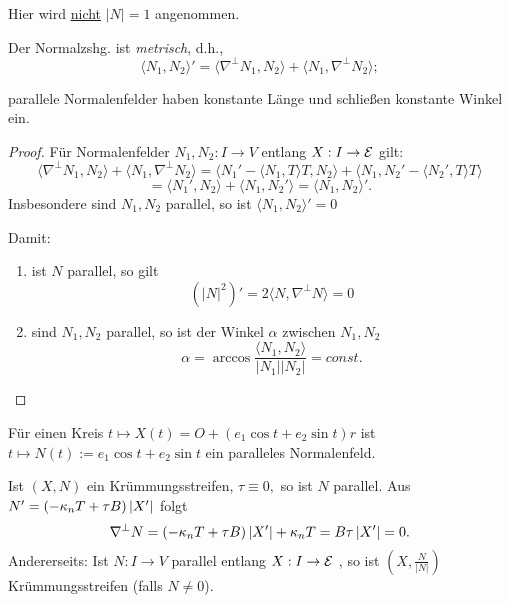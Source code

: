 \begin{remark}
	Hier wird \underline{nicht} $| N | = 1$ angenommen.
\end{remark}

\begin{lemma}
	Der Normalzshg. ist \emph{metrisch}, d.h., $$ \langle N_1,N_2 \rangle ' = \langle \nabla^\perp N_1,N_2 \rangle + \langle N_1, \nabla^\perp N_2 \rangle; $$
	
	parallele Normalenfelder haben konstante Länge und schließen konstante Winkel ein.
\end{lemma}

\begin{proof}
		
		Für Normalenfelder $N_1, N_2 : I \rightarrow V$ entlang $X: I\rightarrow \mathcal E$ gilt:
		\[ \langle \nabla^\perp N_1,N_2 \rangle + \langle N_1,\nabla^\perp N_2 \rangle = \langle N_1'- \langle N_1,T \rangle T,N_2 \rangle + \langle N_1,N_2' - \langle N_2',T \rangle T \rangle\]
		\[ =\langle N_1',N_2 \rangle + \langle N_1,N_2' \rangle = \langle N_1,N_2 \rangle ' .\]
		Insbesondere sind $N_1,N_2$ parallel, so ist $\langle N_1,N_2 \rangle ' = 0$
		
		Damit: 
		
		\begin{enumerate}
			\item  ist $N$ parallel, so gilt $$ (|N|^2)' = 2 \langle N,\nabla^\perp N \rangle = 0$$
			
			\item  sind $N_1, N_2$ parallel, so ist der Winkel $\alpha$ zwischen $N_1,N_2$
			$$ \alpha = \arccos \frac{\langle N_1,N_2 \rangle}{|N_1||N_2|}= const. $$
		\end{enumerate}
		
\end{proof}

\begin{example}
	Für einen Kreis $t \mapsto X(t) = O + (e_1 \cos t + e_2 \sin t)r$ ist $t\mapsto N(t) := e_1 \cos t + e_2 \sin t$ ein paralleles Normalenfeld.
\end{example}


\begin{remark}
	Ist $(X,N)$ ein Krümmungsstreifen, $\tau \equiv 0,$ so ist $N$ parallel. Aus $ N' = (-\kappa_n T + \tau B)\left| X'\right| $ folgt
	\[  \nabla^\perp N  = (-\kappa_n T + \tau B)\left| X'\right| +\kappa_nT = B\tau\left| X'\right|= 0. \]
	Andererseits: Ist $N: I \rightarrow V$ parallel entlang $X: I \rightarrow \mathcal E$ , so ist $ (X,\frac{N}{|N|}) $ Krümmungsstreifen (falls $N \not = 0$).
\end{remark}

